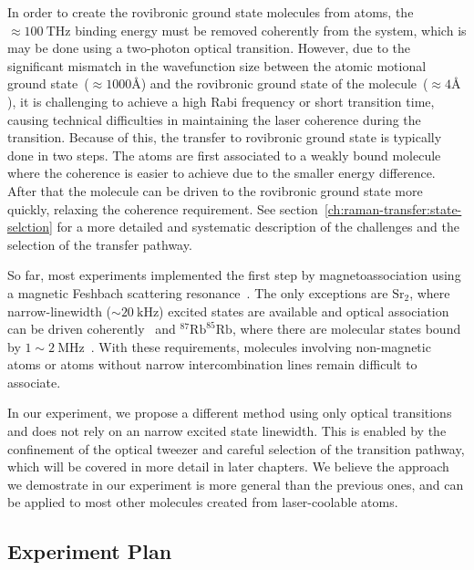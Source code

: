 In order to create the rovibronic ground state molecules from atoms,
the $\approx100~\mathrm{THz}$ binding energy must be removed coherently from the system,
which is may be done using a two-photon optical transition.
However, due to the significant mismatch in the wavefunction size
between the atomic motional ground state~($\approx1000\text{\AA}$)
and the rovibronic ground state of the molecule~($\approx4\text{\AA}$),
it is challenging to achieve a high Rabi frequency or short transition time,
causing technical difficulties in maintaining the laser coherence during the transition.
Because of this, the transfer to rovibronic ground state is typically done in two steps.
The atoms are first associated to a weakly bound molecule
where the coherence is easier to achieve due to the smaller energy difference.
After that the molecule can be driven to the rovibronic ground state more quickly,
relaxing the coherence requirement. See section~\ref{ch:raman-transfer:state-selction}
for a more detailed and systematic description of the challenges
and the selection of the transfer pathway.

So far, most experiments implemented the first step
by magnetoassociation using a magnetic Feshbach scattering resonance~\cite{
  ni_high_2008,zhang_forming_2020}.
The only exceptions are $\mathrm{Sr}_2$,
where narrow-linewidth ($\sim 20~\mathrm{kHz}$) excited states
are available and optical association can be driven coherently~\cite{
  reinaudi_optical_2012,stellmer_creation_2012}
and $^{87}\mathrm{Rb}^{85}\mathrm{Rb}$,
where there are molecular states bound by $1\sim2~\mathrm{MHz}$~\cite{he_coherently_2020}.
With these requirements, molecules involving non-magnetic atoms
or atoms without narrow intercombination lines remain difficult to associate.

In our experiment, we propose a different method using only optical transitions
and does not rely on an narrow excited state linewidth.
This is enabled by the confinement of the optical tweezer and
careful selection of the transition pathway,
which will be covered in more detail in later chapters.
We believe the approach we demostrate in our experiment is more general
than the previous ones,
and can be applied to most other molecules created from laser-coolable atoms.

\subsection{Experiment Plan}
\label{ch:introduction:tweezers:plan}

